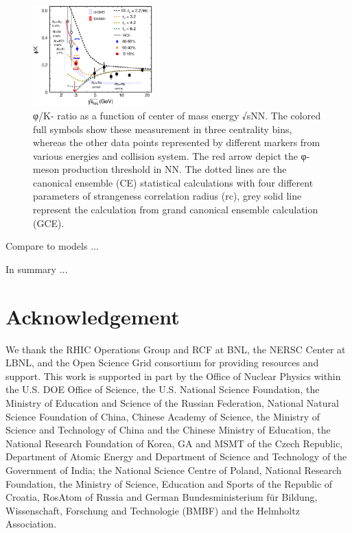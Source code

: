 \documentclass[%
 reprint,	
showpacs,
 amsmath,amssymb,
 aps,
 prc,
]{revtex4-1}
\begin{document}
\begin{figure}
\centering
\includegraphics[width=0.41\textwidth]{fig/fig4_phi_over_kminus_zoomin.eps}
  \caption{  φ/K- ratio as a function of center of mass energy √sNN. The colored full symbols show these measurement in three centrality bins, whereas the other data points represented by different markers from various energies and collision system. The red arrow depict the φ-meson production threshold in NN. The dotted lines are the canonical ensemble (CE) statistical calculations with four different parameters of strangeness correlation radius (rc), grey solid line represent the calculation from grand canonical ensemble calculation (GCE).}
\label{fig:phi2Kratio} 
\end{figure}

Compare to models ...


In summary ...



\section{Acknowledgement}
\label{acknowledgement}

We thank the RHIC Operations Group and RCF at BNL, the NERSC Center at LBNL, and the Open Science Grid consortium for providing resources and support. This work is supported in part by the Office of Nuclear Physics within the U.S. DOE Office of Science, the U.S. National Science Foundation, the Ministry of Education and Science of the Russian Federation, National Natural Science Foundation of China, Chinese Academy of Science, the Ministry of Science and Technology of China and the Chinese Ministry of Education, the National Research Foundation of Korea, GA and MSMT of the Czech Republic, Department of Atomic Energy and Department of Science and Technology of the Government of India; the National Science Centre of Poland, National Research Foundation, the Ministry of Science, Education and Sports of the Republic of Croatia, RosAtom of Russia and German Bundesministerium f{\"u}r Bildung, Wissenschaft, Forschung and Technologie (BMBF) and the Helmholtz Association.


\end{document}
